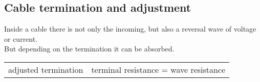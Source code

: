 \subsection{Cable termination and adjustment}
Inside a cable there is not only the incoming, but also a reversal wave of voltage or current.\\
But depending on the termination it can be absorbed.
\begin{itemize}
\begin{table*}
\begin{tabular}{ll}
\item{adjusted termination}&\item{terminal resistance = wave resistance}
\end{tabular}
\end{table*}
\end{itemize}